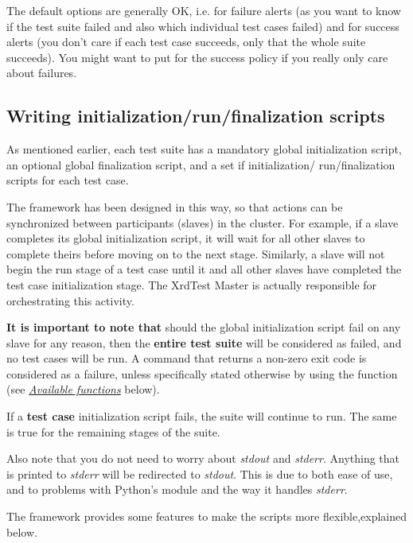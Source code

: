 \documentclass[a4paper,11pt,openany]{sphinxmanual}
\begin{document}
The default options are generally OK, i.e.  for failure alerts (as you
want to know if the test suite failed and also which individual test cases failed)
and  for success alerts (you don't care if each test case succeeds, only
that the whole suite succeeds). You might want to put  for the success
policy if you really only care about failures.


\subsection{Writing initialization/run/finalization scripts}
\label{testsuites:writing-initialization-run-finalization-scripts}\label{testsuites:scripts}
As mentioned earlier, each test suite has a mandatory global initialization
script, an optional global finalization script, and a set if initialization/
run/finalization scripts for each test case.

The framework has been designed in this way, so that actions can be synchronized
between participants (slaves) in the cluster. For example, if a slave completes
its global initialization script, it will wait for all other slaves to complete
theirs before moving on to the next stage. Similarly, a slave will not begin the
run stage of a test case until it and all other slaves have completed the test
case initialization stage. The XrdTest Master is actually responsible for
orchestrating this activity.

\textbf{It is important to note that} should the global initialization script fail
on any slave for any reason, then the \textbf{entire test suite} will be considered
as failed, and no test cases will be run. A command that returns a non-zero
exit code is considered as a failure, unless specifically stated otherwise by
using the  function (see {\hyperref[testsuites:functions]{\emph{Available functions}}} below).

If a \textbf{test case} initialization script fails, the suite will continue to run.
The same is true for the remaining stages of the suite.

Also note that you do not need to worry about \emph{stdout} and \emph{stderr}. Anything
that is printed to \emph{stderr} will be redirected to \emph{stdout}. This is due to
both ease of use, and to problems with Python's  module and the
way it handles \emph{stderr}.

The framework provides some features to make the scripts more flexible,explained
below.
\end{document}
